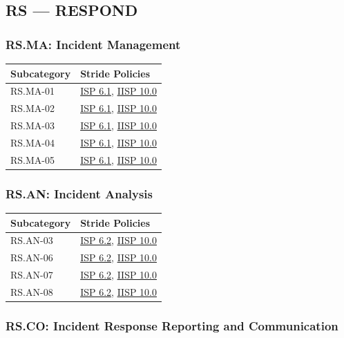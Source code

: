 \documentclass[11pt,landscape]{article}
\begin{document}
\subsection{RS --- RESPOND}

\subsubsection{RS.MA: Incident Management}

\begin{tabularx}{\textwidth}{|p{3.5cm}|X|}
\hline
\rowcolor{headgray} \textbf{Subcategory} & \textbf{Stride Policies} \\
\hline
RS.MA-01 & \hyperref[pol:ISP61]{ISP 6.1}, \hyperref[pol:IISP100]{IISP 10.0} \\
\hline
RS.MA-02 & \hyperref[pol:ISP61]{ISP 6.1}, \hyperref[pol:IISP100]{IISP 10.0} \\
\hline
RS.MA-03 & \hyperref[pol:ISP61]{ISP 6.1}, \hyperref[pol:IISP100]{IISP 10.0} \\
\hline
RS.MA-04 & \hyperref[pol:ISP61]{ISP 6.1}, \hyperref[pol:IISP100]{IISP 10.0} \\
\hline
RS.MA-05 & \hyperref[pol:ISP61]{ISP 6.1}, \hyperref[pol:IISP100]{IISP 10.0} \\
\hline
\end{tabularx}

\subsubsection{RS.AN: Incident Analysis}

\begin{tabularx}{\textwidth}{|p{3.5cm}|X|}
\hline
\rowcolor{headgray} \textbf{Subcategory} & \textbf{Stride Policies} \\
\hline
RS.AN-03 & \hyperref[pol:ISP62]{ISP 6.2}, \hyperref[pol:IISP100]{IISP 10.0} \\
\hline
RS.AN-06 & \hyperref[pol:ISP62]{ISP 6.2}, \hyperref[pol:IISP100]{IISP 10.0} \\
\hline
RS.AN-07 & \hyperref[pol:ISP62]{ISP 6.2}, \hyperref[pol:IISP100]{IISP 10.0} \\
\hline
RS.AN-08 & \hyperref[pol:ISP62]{ISP 6.2}, \hyperref[pol:IISP100]{IISP 10.0} \\
\hline
\end{tabularx}

\subsubsection{RS.CO: Incident Response Reporting and Communication}
\end{document}

